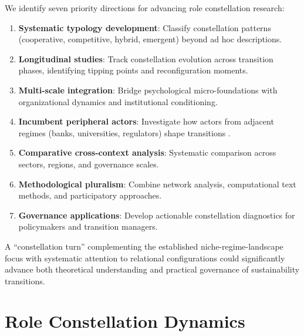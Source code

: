 \documentclass[../main.tex]{subfiles}
\begin{document}
We identify seven priority directions for advancing role constellation research:

\begin{enumerate}[noitemsep,topsep=0pt]
    \item \textbf{Systematic typology development}: Classify constellation patterns (cooperative, competitive, hybrid, emergent) beyond ad hoc descriptions.
    \item \textbf{Longitudinal studies}: Track constellation evolution across transition phases, identifying tipping points and reconfiguration moments.
    \item \textbf{Multi-scale integration}: Bridge psychological micro-foundations with organizational dynamics and institutional conditioning.
    \item \textbf{Incumbent peripheral actors}: Investigate how actors from adjacent regimes (banks, universities, regulators) shape transitions \citep{coen2025view}.
    \item \textbf{Comparative cross-context analysis}: Systematic comparison across sectors, regions, and governance scales.
    \item \textbf{Methodological pluralism}: Combine network analysis, computational text methods, and participatory approaches.
    \item \textbf{Governance applications}: Develop actionable constellation diagnostics for policymakers and transition managers.
\end{enumerate}

A ``constellation turn'' complementing the established niche-regime-landscape focus with systematic attention to relational configurations could significantly advance both theoretical understanding and practical governance of sustainability transitions.

\section{Role Constellation Dynamics}
\end{document}
